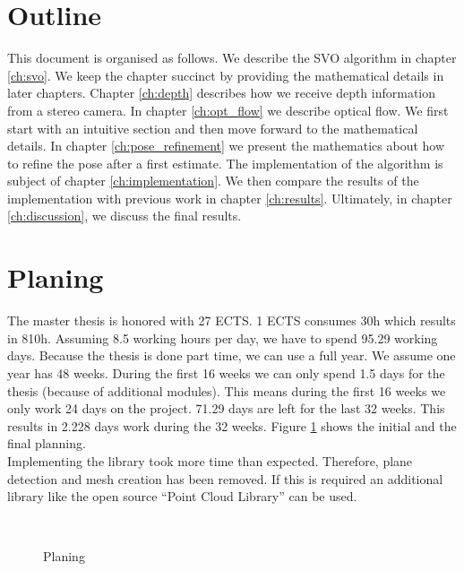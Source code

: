 \documentclass[11pt,a4paper,titlepage,oneside]{report}
\begin{document}
\section{Outline}

This document is organised as follows. We describe the SVO algorithm in chapter \ref{ch:svo}. We keep the chapter succinct by providing the mathematical details in later chapters. Chapter \ref{ch:depth} describes how we receive depth information from a stereo camera. In chapter \ref{ch:opt_flow} we describe optical flow. We first start with an intuitive section and then move forward to the mathematical details. In chapter \ref{ch:pose_refinement} we present the mathematics about how to refine the pose after a first estimate. The implementation of the algorithm is subject of chapter \ref{ch:implementation}. We then compare the results of the implementation with previous work in chapter \ref{ch:results}. Ultimately, in chapter \ref{ch:discussion}, we discuss the final results.

\section{Planing}
The master thesis is honored with 27 ECTS. 1 ECTS consumes 30h which results in 810h. Assuming 8.5 working hours per day, we have to spend 95.29 working days. Because the thesis is done part time, we can use a full year. We assume one year has 48 weeks. During the first 16 weeks we can only spend 1.5 days for the thesis (because of additional modules). This means during the first 16 weeks we only work 24 days on the project. 71.29 days are left for the last 32 weeks. This results in 2.228 days work during the 32 weeks. Figure \ref{fig:gantt} shows the initial and the final planning.\\
Implementing the library took more time than expected. Therefore, plane detection and mesh creation has been removed. If this is required an additional library like the open source ``Point Cloud Library'' \cite{pcl} can be used.

\begin{figure}[H]
  \\
  \caption{Planing}\label{fig:gantt}
\end{figure}
\end{document}
